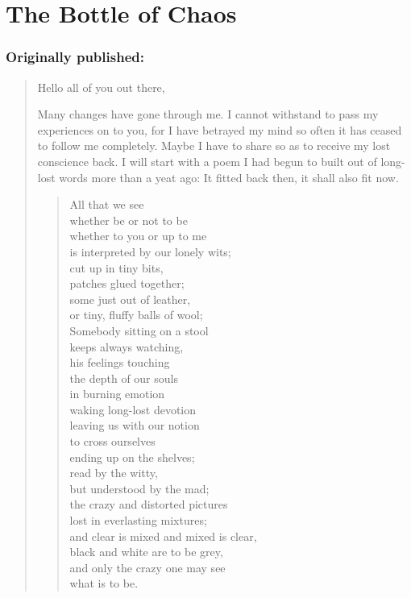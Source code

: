 \chapter{The Bottle of Chaos}
\label{cha:bottle-of-chaos}
\subsection*{Originally published: }
\begin{quote}
Hello all of you out there, 

Many changes have gone through me. I cannot withstand to pass my experiences on to you, for I have betrayed my mind so often it has ceased to follow me completely. Maybe I have to share so as to receive my lost conscience back. 
I will start with a poem I had begun to built out of long-lost words more than a yeat ago: It fitted back then, it shall also fit now. 

\begin{quote}
All that we see \\
whether be or not to be \\
whether to you or up to me \\
is interpreted by our lonely wits; \\
cut up in tiny bits, \\
patches glued together; \\
some just out of leather, \\
or tiny, fluffy balls of wool; \\
Somebody sitting on a stool \\
keeps always watching, \\
his feelings touching\\
the depth of our souls \\
in burning emotion \\
waking long-lost devotion \\
leaving us with our notion \\
to cross ourselves \\
ending up on the shelves; \\
read by the witty, \\
but understood by the mad; \\
the crazy and distorted pictures \\
lost in everlasting mixtures; \\
and clear is mixed and mixed is clear, \\
black and white are to be grey, \\
and only the crazy one may see \\
what is to be.
\end{quote}


\end{quote}
